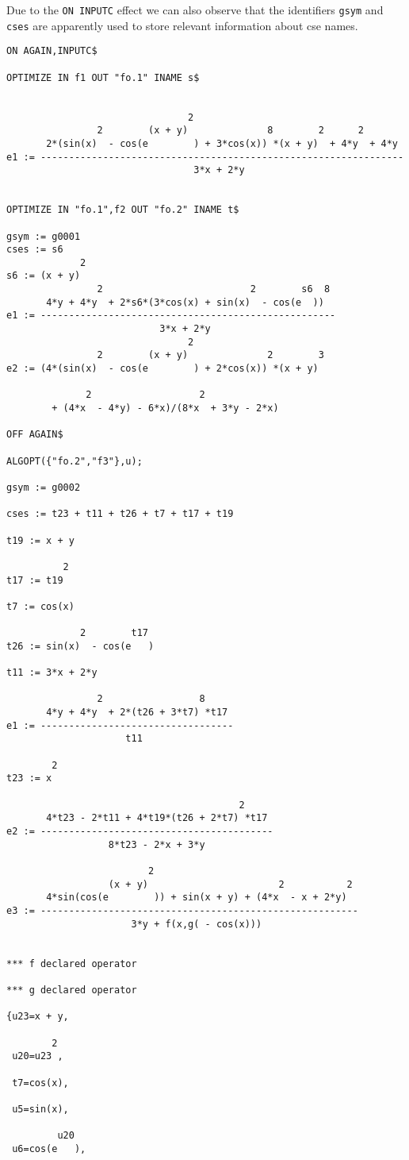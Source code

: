 Due to the {\tt ON INPUTC} effect we can also observe that the identifiers
{\tt gsym} and {\tt cses} are apparently used to store relevant information
about cse names.

{\small
\begin{verbatim}
ON AGAIN,INPUTC$

OPTIMIZE IN f1 OUT "fo.1" INAME s$


                                2
                2        (x + y)              8        2      2
       2*(sin(x)  - cos(e        ) + 3*cos(x)) *(x + y)  + 4*y  + 4*y
e1 := ----------------------------------------------------------------
                                 3*x + 2*y


OPTIMIZE IN "fo.1",f2 OUT "fo.2" INAME t$

gsym := g0001
cses := s6
             2
s6 := (x + y)
                2                          2        s6  8
       4*y + 4*y  + 2*s6*(3*cos(x) + sin(x)  - cos(e  ))
e1 := ----------------------------------------------------
                           3*x + 2*y
                                2
                2        (x + y)              2        3
e2 := (4*(sin(x)  - cos(e        ) + 2*cos(x)) *(x + y)

              2                   2
        + (4*x  - 4*y) - 6*x)/(8*x  + 3*y - 2*x)

OFF AGAIN$

ALGOPT({"fo.2","f3"},u);

gsym := g0002

cses := t23 + t11 + t26 + t7 + t17 + t19

t19 := x + y

          2
t17 := t19

t7 := cos(x)

             2        t17
t26 := sin(x)  - cos(e   )

t11 := 3*x + 2*y

                2                 8
       4*y + 4*y  + 2*(t26 + 3*t7) *t17
e1 := ----------------------------------
                     t11

        2
t23 := x

                                         2
       4*t23 - 2*t11 + 4*t19*(t26 + 2*t7) *t17
e2 := -----------------------------------------
                  8*t23 - 2*x + 3*y

                         2
                  (x + y)                       2           2
       4*sin(cos(e        )) + sin(x + y) + (4*x  - x + 2*y)
e3 := --------------------------------------------------------
                      3*y + f(x,g( - cos(x)))


*** f declared operator 

*** g declared operator 

{u23=x + y,

        2
 u20=u23 ,

 t7=cos(x),

 u5=sin(x),

         u20
 u6=cos(e   ),

\end{verbatim}}
